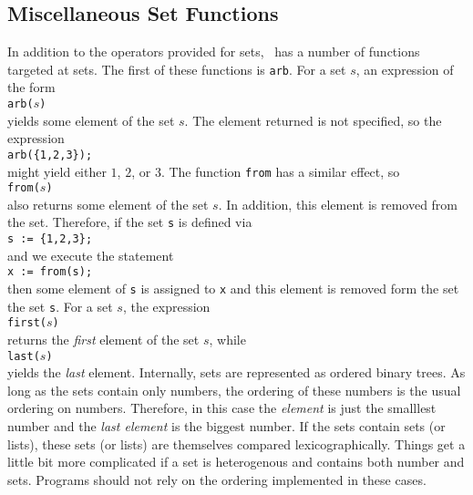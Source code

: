 \subsection{Miscellaneous Set Functions}
In addition to the operators provided for sets, \setlx\ has a number of functions targeted at sets.
The first of these functions is \texttt{arb}.  For a set $s$,  an expression of the form
\\[0.2cm]
\hspace*{1.3cm}
\texttt{arb($s$)}
\\[0.2cm]
yields some element of the set $s$.  The element returned is not specified, so the expression
\\[0.2cm]
\hspace*{1.3cm}
\texttt{arb(\{1,2,3\});}
\\[0.2cm]
might yield either $1$, $2$, or $3$. 
 The function \texttt{from} has a similar effect, so
\\[0.2cm]
\hspace*{1.3cm}
\texttt{from($s$)}
\\[0.2cm]
also returns some element of the set $s$.  In addition, this element is removed from the set.
Therefore, if the set \texttt{s} is defined via
\\[0.2cm]
\hspace*{1.3cm}
\texttt{s := \{1,2,3\};}
\\[0.2cm]
and we execute the statement 
\\[0.2cm]
\hspace*{1.3cm}
\texttt{x := from(s);}
\\[0.2cm]
then some element of \texttt{s} is assigned to \texttt{x} and this element is removed form the set
the set \texttt{s}.  For a set $s$,  the expression 
\\[0.2cm]
\hspace*{1.3cm}
\texttt{first($s$)}
\\[0.2cm]
returns the \emph{first} element of the set $s$, while
\\[0.2cm]
\hspace*{1.3cm}
\texttt{last($s$)} 
\\[0.2cm]
yields the \emph{last} element.  Internally, sets are represented as ordered binary trees.  As long
as the sets contain only numbers, the ordering of these numbers is the usual ordering on
numbers. Therefore, in this case the \emph{element} is just the smalllest number and the 
\emph{last element} is the biggest number.  If the sets contain sets (or lists), these sets (or
lists) are themselves compared lexicographically.  
Things get a little bit more complicated if a set is heterogenous and contains both number and sets.
Programs should not rely on the ordering implemented in these cases.

